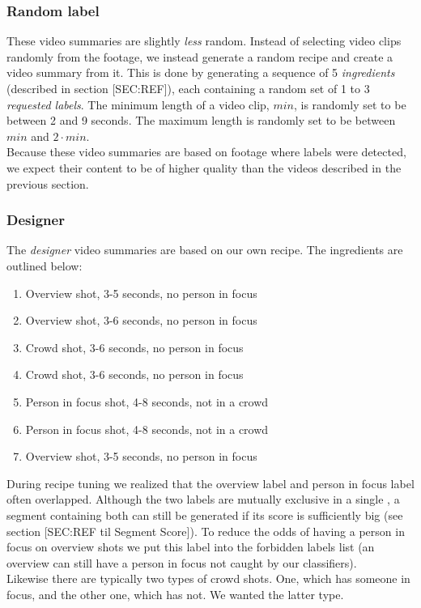 \subsubsection{Random label}
%
These video summaries are slightly \textit{less} random. Instead of selecting video clips randomly from the footage, we instead generate a random recipe and create a video summary from it. This is done by generating a sequence of 5 \textit{ingredients} (described in section [SEC:REF]), each containing a random set of 1 to 3 \textit{requested labels}. The minimum length of a video clip, $min$, is randomly set to be between 2 and 9 seconds. The maximum length is randomly set to be between $min$ and $2 \cdot min$.\\
Because these video summaries are based on footage where labels were detected, we expect their content to be of higher quality than the videos described in the previous section.
%
\subsubsection{Designer}\label{sec:phase4designer}
%
The \textit{designer} video summaries are based on our own recipe. The ingredients are outlined below:
\begin{enumerate}
\item Overview shot, 3-5 seconds, no person in focus
\item Overview shot, 3-6 seconds, no person in focus
\item Crowd shot, 3-6 seconds, no person in focus
\item Crowd shot, 3-6 seconds, no person in focus
\item Person in focus shot, 4-8 seconds, not in a crowd
\item Person in focus shot, 4-8 seconds, not in a crowd
\item Overview shot, 3-5 seconds, no person in focus
\end{enumerate}
%
During recipe tuning we realized that the overview label and person in focus label often overlapped. Although the two labels are mutually exclusive in a single 
, a segment containing both can still be generated if its score is sufficiently big (see section [SEC:REF til Segment Score]). To reduce the odds of having a person in focus on overview shots we put this label into the forbidden labels list (an overview can still have a person in focus not caught by our classifiers).\\
Likewise there are typically two types of crowd shots. One, which has someone in focus, and the other one, which has not. We wanted the latter type.
%
